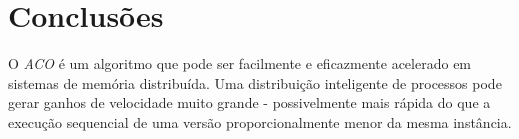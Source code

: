 \section{Conclusões}
O \textit{ACO} é um algoritmo que pode ser facilmente e eficazmente acelerado em sistemas de memória distribuída. Uma distribuição inteligente de processos pode gerar ganhos de velocidade muito grande - possivelmente mais rápida do que a execução sequencial de uma versão proporcionalmente menor da mesma instância.